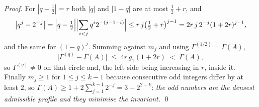 \documentclass[11pt,a4paper]{article}
\theoremstyle{plain}
\theoremstyle{definition}
\theoremstyle{remark}
\begin{document}
\begin{proof}
For $|q-\tfrac12|=r$ both $|q|$ and $|1-q|$ are at most $\tfrac12+r$, and
\[
  \bigl|q^{j}-2^{-j}\bigr|
  =\Bigl|q-\tfrac12\Bigr|\Bigl|\sum_{i<j}q^{i}2^{-(j-1-i)}\Bigr|
  \le r\,j\bigl(\tfrac12+r\bigr)^{j-1}
  = 2r\,j\,2^{-j}(1+2r)^{j-1},
\]
and the same for $(1-q)^{j}$. Summing against $m_j$ and using $\Gamma^{(1/2)}=\Gamma(A)$,
\[
  \bigl|\Gamma^{(q)}-\Gamma(A)\bigr|\;\le\;4r\,g_1(1+2r)\;<\;\Gamma(A),
\]
so $\Gamma^{(q)}\ne0$ on that circle and, the left side being increasing in $r$, inside it.
Finally $m_j\ge1$ for $1\le j\le k-1$ because consecutive odd integers differ by at least $2$,
so $\Gamma(A)\ge1+2\sum_{j=1}^{k-1}2^{-j}=3-2^{2-k}$: \emph{the odd numbers are the densest
admissible profile and they minimise the invariant.} \qed
\end{proof}
\end{document}
